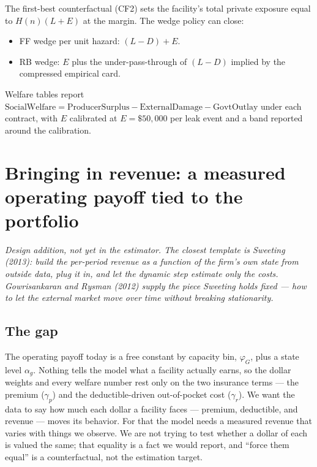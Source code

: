 \documentclass[
  letterpaper,
  DIV=11,
  numbers=noendperiod]{scrartcl}
\providecommand{\tightlist}{%
  \setlength{\itemsep}{0pt}\setlength{\parskip}{0pt}}\usepackage{longtable,booktabs,array}
\begin{document}
The first-best counterfactual (CF2) sets the facility's total private
exposure equal to \(H(n)(L + E)\) at the margin. The wedge policy can
close:

\begin{itemize}
\tightlist
\item
  FF wedge per unit hazard: \((L - D) + E\).
\item
  RB wedge: \(E\) plus the under-pass-through of \((L - D)\) implied by
  the compressed empirical card.
\end{itemize}

Welfare tables report \(\text{SocialWelfare} = \text{ProducerSurplus} -
\text{ExternalDamage} - \text{GovtOutlay}\) under each contract, with
\(E\) calibrated at \(E = \$50{,}000\) per leak event and a band
reported around the calibration.

\newpage

\section{Bringing in revenue: a measured operating payoff tied to the
portfolio}\label{sec-rev}

\emph{Design addition, not yet in the estimator. The closest template is
Sweeting (2013): build the per-period revenue as a function of the
firm's own state from outside data, plug it in, and let the dynamic step
estimate only the costs. Gowrisankaran and Rysman (2012) supply the
piece Sweeting holds fixed --- how to let the external market move over
time without breaking stationarity.}

\subsection{The gap}\label{the-gap}

The operating payoff today is a free constant by capacity bin,
\(\varphi_G\), plus a state level \(\alpha_g\). Nothing tells the model
what a facility actually earns, so the dollar weights and every welfare
number rest only on the two insurance terms --- the premium
(\(\gamma_p\)) and the deductible-driven out-of-pocket cost
(\(\gamma_r\)). We want the data to say how much each dollar a facility
faces --- premium, deductible, and revenue --- moves its behavior. For
that the model needs a measured revenue that varies with things we
observe. We are not trying to test whether a dollar of each is valued
the same; that equality is a fact we would report, and ``force them
equal'' is a counterfactual, not the estimation target.
\end{document}
